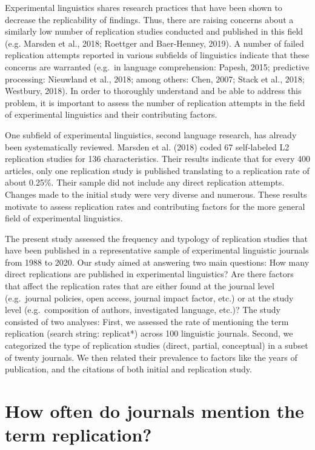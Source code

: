 \documentclass[]{elsarticle} %
\begin{document}
Experimental linguistics shares research practices that have been shown
to decrease the replicability of findings. Thus, there are raising
concerns about a similarly low number of replication studies conducted
and published in this field (e.g. Marsden et al., 2018; Roettger and
Baer-Henney, 2019). A number of failed replication attempts reported in
various subfields of linguistics indicate that these concerns are
warranted (e.g.~in language comprehension: Papesh, 2015; predictive
processing: Nieuwland et al., 2018; among others: Chen, 2007; Stack et
al., 2018; Westbury, 2018). In order to thoroughly understand and be
able to address this problem, it is important to assess the number of
replication attempts in the field of experimental linguistics and their
contributing factors.

One subfield of experimental linguistics, second language research, has
already been systematically reviewed. Marsden et al. (2018) coded 67
self-labeled L2 replication studies for 136 characteristics. Their
results indicate that for every 400 articles, only one replication study
is published translating to a replication rate of about 0.25\%. Their
sample did not include any direct replication attempts. Changes made to
the initial study were very diverse and numerous. These results motivate
to assess replication rates and contributing factors for the more
general field of experimental linguistics.

The present study assessed the frequency and typology of replication
studies that have been published in a representative sample of
experimental linguistic journals from 1988 to 2020. Our study aimed at
answering two main questions: How many direct replications are published
in experimental linguistics? Are there factors that affect the
replication rates that are either found at the journal level
(e.g.~journal policies, open access, journal impact factor, etc.) or at
the study level (e.g.~composition of authors, investigated language,
etc.)? The study consisted of two analyses: First, we assessed the rate
of mentioning the term replication (search string: replicat*) across 100
linguistic journals. Second, we categorized the type of replication
studies (direct, partial, conceptual) in a subset of twenty journals. We
then related their prevalence to factors like the years of publication,
and the citations of both initial and replication study.

\hypertarget{how-often-do-journals-mention-the-term-replication}{%
\section{How often do journals mention the term
replication?}\label{how-often-do-journals-mention-the-term-replication}}
\end{document}
